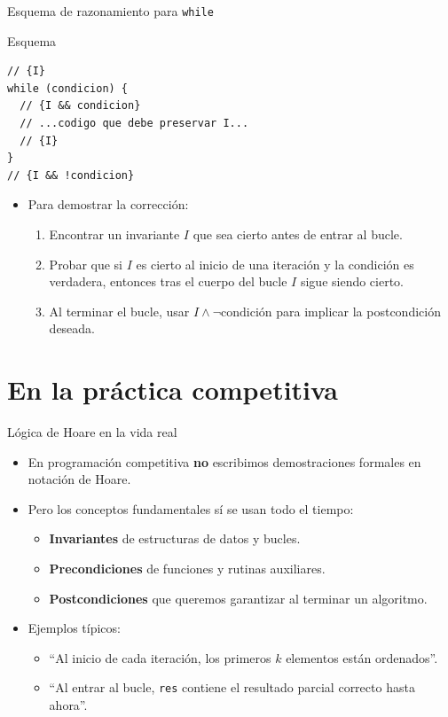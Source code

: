 \documentclass[aspectratio=169]{beamer}
\begin{document}
\begin{frame}[fragile]{Esquema de razonamiento para \texttt{while}}
  \begin{block}{Esquema}
  \begin{lstlisting}[style=customc]
// {I}
while (condicion) {
  // {I && condicion}
  // ...codigo que debe preservar I...
  // {I}
}
// {I && !condicion}
  \end{lstlisting}
  \end{block}
  \begin{itemize}
    \item Para demostrar la corrección:
      \begin{enumerate}
        \item Encontrar un invariante \(I\) que sea cierto antes de entrar al bucle.
        \item Probar que si \(I\) es cierto al inicio de una iteración y la condición es verdadera, entonces tras el cuerpo del bucle \(I\) sigue siendo cierto.
        \item Al terminar el bucle, usar \(I \land \neg\text{condición}\) para implicar la postcondición deseada.
      \end{enumerate}
  \end{itemize}
\end{frame}

\section{En la práctica competitiva}

\begin{frame}{Lógica de Hoare en la vida real}
  \begin{itemize}
    \item En programación competitiva \textbf{no} escribimos demostraciones formales en notación de Hoare.
    \item Pero los conceptos fundamentales sí se usan todo el tiempo:
      \begin{itemize}
        \item \textbf{Invariantes} de estructuras de datos y bucles.
        \item \textbf{Precondiciones} de funciones y rutinas auxiliares.
        \item \textbf{Postcondiciones} que queremos garantizar al terminar un algoritmo.
      \end{itemize}
    \item Ejemplos típicos:
      \begin{itemize}
        \item “Al inicio de cada iteración, los primeros \(k\) elementos están ordenados”.
        \item “Al entrar al bucle, \texttt{res} contiene el resultado parcial correcto hasta ahora”.
      \end{itemize}
  \end{itemize}
\end{frame}
\end{document}
